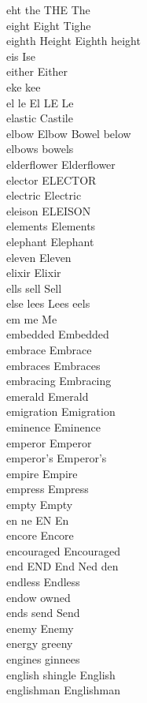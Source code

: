 eht the THE The\\
eight Eight Tighe\\
eighth Height Eighth height\\
eis Ise\\
either Either\\
eke kee\\
el le El LE Le\\
elastic Castile\\
elbow Elbow Bowel below\\
elbows bowels\\
elderflower Elderflower\\
elector ELECTOR\\
electric Electric\\
eleison ELEISON\\
elements Elements\\
elephant Elephant\\
eleven Eleven\\
elixir Elixir\\
ells sell Sell\\
else lees Lees eels\\
em me Me\\
embedded Embedded\\
embrace Embrace\\
embraces Embraces\\
embracing Embracing\\
emerald Emerald\\
emigration Emigration\\
eminence Eminence\\
emperor Emperor\\
emperor's Emperor's\\
empire Empire\\
empress Empress\\
empty Empty\\
en ne EN En\\
encore Encore\\
encouraged Encouraged\\
end END End Ned den\\
endless Endless\\
endow owned\\
ends send Send\\
enemy Enemy\\
energy greeny\\
engines ginnees\\
english shingle English\\
englishman Englishman\\
